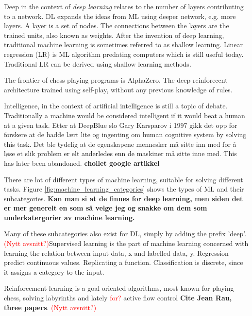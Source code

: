 \documentclass{article}
\begin{document}
Deep in the context of \textit{deep learning} relates to the number of layers contributing to a network. DL expands the ideas from ML using deeper network, e.g. more layers. A layer is a set of nodes. The connections between the layers are the trained units, also known as weights. After the invention of deep learning, traditional machine learning is sometimes referred to as shallow learning. Linear regression (LR) is ML algorithm predating computers which is still useful today. Traditional LR can be derived using shallow learning methods.

The frontier of chess playing programs is AlphaZero. The deep reinforecent architecture trained using self-play, without any previous knowledge of rules. 

Intelligence, in the context of artificial intelligence is still a topic of debate. Traditionally a machine would be considered intelligent if it would beat a human at a given task. Etter at DeepBlue slo Gary Karsparov i 1997 gikk det opp for forskere at de hadde lært lite og ingenting om human cognitive system by solving this task. Det ble tydelig at de egenskapene mennesker må sitte inn med for å løse et slik problem er elt anderledes enn de maskiner må sitte inne med. This has later been abandoned. \textbf{chollet google artikkel}

There are lot of different types of machine learning, suitable for solving different tasks. Figure \ref{fig:machine_learning_categories} shows the types of ML and their subcategories. \textbf{Kan man si at de finnes for deep learning, men siden det er mer generelt en som så velge jeg og snakke om dem som underkatergorier av machine learning.}

Many of these subcategories also exist for DL, simply by adding the prefix 'deep'. \textcolor{red}{(Nytt avsnitt?)}Supervised learning is the part of machine learning concerned with learning the relation between input data, x and labelled data, y. Regression predict continuous values. Replicating a function. Classification is discrete, since it assigns a category to the input. 

Reinforcement learning is a goal-oriented algorithms, most known for playing chess, solving labyrinths and lately \textcolor{red}{for?} active flow control \textbf{Cite Jean Rau, three papers}. \textcolor{red}{(Nytt avsnitt?)} 
\end{document}
